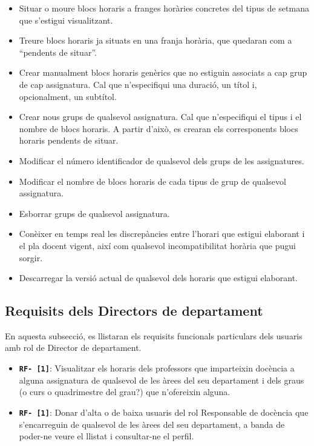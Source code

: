 \documentclass[a4paper,12pt]{ThesisStyle}
\begin{document}
\begin{itemize}
\begin{itemize}
      \item Situar o moure blocs horaris a franges horàries concretes del tipus de setmana que s'estigui visualitzant.
      \item Treure blocs horaris ja situats en una franja horària, que quedaran com a ``pendents de situar''.
      \item Crear manualment blocs horaris genèrics que no estiguin associats a cap grup de cap assignatura. Cal que n'especifiqui una duració, un títol i, opcionalment, un subtítol.
      
      \item Crear nous grups de qualsevol assignatura. Cal que n'especifiqui el tipus i el nombre de blocs horaris. A partir d'això, es crearan els corresponents blocs horaris pendents de situar.
      \item Modificar el número identificador de qualsevol dels grups de les assignatures.
      \item Modificar el nombre de blocs horaris de cada tipus de grup de qualsevol assignatura.
      \item Esborrar grups de qualsevol assignatura.
      \item Conèixer en temps real les discrepàncies entre l'horari que estigui elaborant i el pla docent vigent, així com qualsevol incompatibilitat horària que pugui sorgir.
      
      \item Descarregar la versió actual de qualsevol dels horaris que estigui elaborant.
    \end{itemize}
\end{itemize}

\subsection{Requisits dels Directors de departament} %
\label{subsec:requisits_director_departament}

En aquesta subsecció, es llistaran els requisits funcionals particulars dels usuaris amb rol de Director de departament.

\begin{itemize}
  \item \texttt{\textbf{RF- [1]}}: Visualitzar els horaris dels professors que imparteixin docència a alguna assignatura de qualsevol de les àrees del seu departament i dels graus (o curs o quadrimestre del grau?) que n'ofereixin alguna.
  \item \texttt{\textbf{RF- [1]}}: Donar d'alta o de baixa usuaris del rol Responsable de docència que s'encarreguin de qualsevol de les àrees del seu departament, a banda de poder-ne veure el llistat i consultar-ne el perfil.
\end{itemize}
\end{document}
